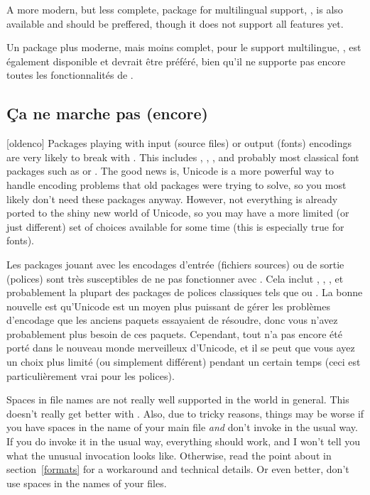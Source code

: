 \documentclass{lltxdoc}
\begin{document}
A more modern, but less complete, package for multilingual support,
, is also available and should be preffered, though it does
not support all  features yet.

Un package plus moderne, mais moins complet, pour le support multilingue, , est également disponible et devrait être préféré, bien qu'il ne supporte pas encore toutes les fonctionnalités de .

\subsection{Ça ne marche pas (encore)}\label{notworking}

[oldenco] Packages playing with input (source files) or
output (fonts) encodings are very likely to break with \luatex. This includes
, , , and probably most classical font
packages such as  or . The good news
is, Unicode is a more powerful way to handle encoding problems that old
packages were trying to solve, so you most likely don't need these packages
anyway. However, not everything is already ported to the shiny new world of
Unicode, so you may have a more limited (or just different) set of choices
available for some time (this is especially true for fonts).

Les packages jouant avec les encodages d'entrée (fichiers sources) ou de sortie (polices) sont très susceptibles de ne pas fonctionner avec \luatex. Cela inclut , , , et probablement la plupart des packages de polices classiques tels que  ou . La bonne nouvelle est qu'Unicode est un moyen plus puissant de gérer les problèmes d'encodage que les anciens paquets essayaient de résoudre, donc vous n'avez probablement plus besoin de ces paquets. Cependant, tout n'a pas encore été porté dans le nouveau monde merveilleux d'Unicode, et il se peut que vous ayez un choix plus limité (ou simplement différent) pendant un certain temps (ceci est particulièrement vrai pour les polices).

 Spaces in file names are not really well supported in the \tex
world in general. This doesn't really get better with \luatex. Also, due to
tricky reasons, things may be worse if you have spaces in the name of your main
\tex file \emph{and} don't invoke \luatex in the usual way. If you do
invoke it in the usual way, everything should work, and I won't tell you what
the unusual invocation looks like. Otherwise, read the point about
 in section~\ref{formats} for a workaround and technical
details. Or even better, don't use spaces in the names of your \tex files.
\end{document}
